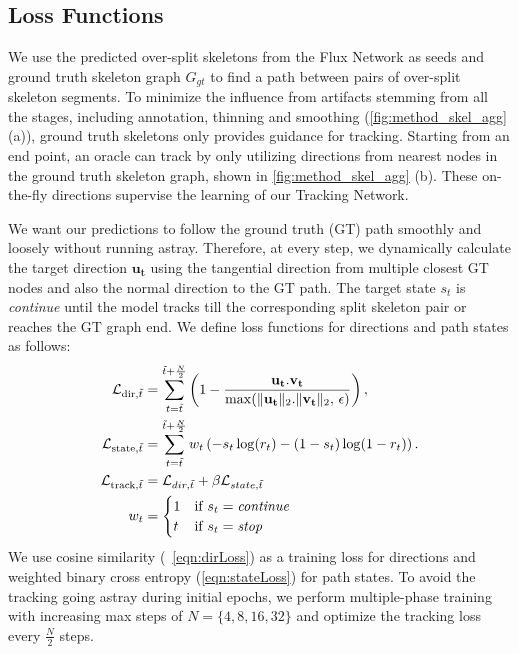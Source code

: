\subsection{Loss Functions}
We use the predicted over-split skeletons from the Flux Network as seeds and ground truth skeleton graph $G_{gt}$ to find a path between pairs of over-split skeleton segments. 
To minimize the influence from artifacts stemming from all the stages, including annotation, thinning and smoothing (\autoref{fig:method_skel_agg} (a)), ground truth skeletons only provides guidance for tracking. Starting from an end point, an oracle can track by only utilizing directions from nearest nodes in the ground truth skeleton graph, shown in \autoref{fig:method_skel_agg} (b). These on-the-fly directions supervise the learning of our Tracking Network.

We want our predictions to follow the ground truth (GT) path smoothly and loosely without running astray. Therefore, at every step, we dynamically calculate the target direction $\mathbf{u_t}$ using the tangential direction from multiple closest GT nodes and also the normal direction to the GT path.
The target state $s_t$ is \textit{continue} until the model tracks till the corresponding split skeleton pair or reaches the GT graph end. We define loss functions for directions and path states as follows: 
\begin{align}
\mathcal{L}_{\text{dir}, \Tilde{t}}&= \sum_{t=\Tilde{t}}^{\Tilde{t} + \frac{N}{2}} \left( 1 - \frac{\mathbf{u_t}.\mathbf{v_t}}{\max(\|\mathbf{u_t}\|_2.\|\mathbf{v_t}\|_2,\,\epsilon)} \right), \label{eqn:dirLoss}\\
\mathcal{L}_{\text{state}, \Tilde{t}}&= \sum_{t=\Tilde{t}}^{\Tilde{t} + \frac{N}{2}} w_t \left( -s_t\log(r_t) - (1-s_t)\log(1-r_t) \right). \label{eqn:stateLoss}\\
\mathcal{L}_{\text{track}, \Tilde{t}} &= \mathcal{L}_{dir, \Tilde{t}} + \beta\mathcal{L}_{state, \Tilde{t}}\label{eqn:trackingLoss}\\
w_t&= \begin{cases}
1  & \text{if } s_t = \text{\textit{continue}} \\
t & \text{if } s_t = \text{\textit{stop}}
\end{cases}\label{eqn:trackingWeight}
\end{align}
We use cosine similarity (~\autoref{eqn:dirLoss}) as a training loss for directions and weighted binary cross entropy (\autoref{eqn:stateLoss}) for path states. To avoid the tracking going astray during initial epochs, we perform multiple-phase training with increasing max steps of $N=\{4, 8, 16, 32\}$ and optimize the tracking loss every $\frac{N}{2}$ steps.

